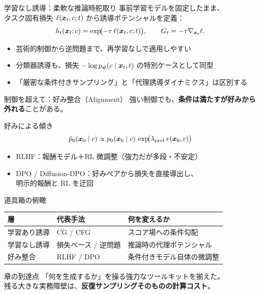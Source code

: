 \asmain
\begin{frame}{学習なし誘導：柔軟な推論時舵取り}
    事前学習モデルを固定したまま、\\
    タスク固有損失 $\ell(\bm{x}_t,c;t)$ から誘導ポテンシャルを定義：
    \[
        h_t(\bm{x}_t;c)=\exp\!\bigl(-\tau\,\ell(\bm{x}_t,c;t)\bigr),\qquad
        G_t=-\tau\nabla_{\bm{x}_t}\ell.
    \]
    \begin{itemize}
        \item 芸術的制御から逆問題まで、再学習なしで適用しやすい
        \item 分類器誘導も、損失 $-\log p_{\bm{\psi}}(c\mid\bm{x}_t,t)$ の特別ケースとして同型
        \item 「厳密な条件付きサンプリング」と「代理誘導ダイナミクス」は区別する
    \end{itemize}
\end{frame}
\asmain
\begin{frame}{制御を超えて：好み整合（Alignment）}
    強い制御でも、\textbf{条件は満たすが好みから外れる}ことがある。
    \begin{block}{好みによる傾き}
        \[
            \tilde p_0(\bm{x}_0\mid c)
            \propto
            p_0(\bm{x}_0\mid c)\,
            \exp\!\bigl(\lambda_{\mathrm{pref}}\, r(\bm{x}_0,c)\bigr)
        \]
    \end{block}
    \begin{itemize}
        \item RLHF：報酬モデル＋RL 微調整（強力だが多段・不安定）
        \item DPO / Diffusion-DPO：好みペアから損失を直接導出し、\\
        明示的報酬と RL を迂回
    \end{itemize}
\end{frame}
\asmain
\begin{frame}{道具箱の俯瞰}
    \renewcommand{\arraystretch}{1.25}
    \footnotesize
    \begin{tabular}{lll}
        \textbf{層} & \textbf{代表手法} & \textbf{何を変えるか} \\
        \hline
        学習あり誘導 & CG / CFG & スコア場への条件勾配 \\
        学習なし誘導 & 損失ベース / 逆問題 & 推論時の代理ポテンシャル \\
        好み整合 & RLHF / DPO & 条件付きモデル自体の微調整 \\
    \end{tabular}
    \vfill
    \begin{exampleblock}{章の到達点}
        「何を生成するか」を操る強力なツールキットを揃えた。\\
        残る大きな実務障壁は、\textbf{反復サンプリングそのものの計算コスト}。
    \end{exampleblock}
\end{frame}
